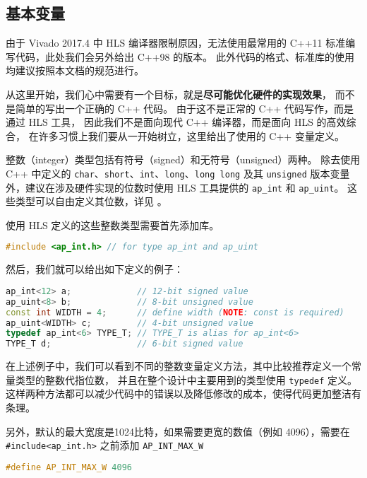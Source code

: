 \documentclass[Chinese,TC,use boldface,simple Names]{beaulivre}
\begin{document}
    \subsection{基本变量}

      \begin{warning}
        由于 Vivado 2017.4 中 HLS 编译器限制原因，无法使用最常用的 C++11 标准编写代码，此处我们会另外给出 C++98 的版本。
        此外代码的格式、标准库的使用均建议按照本文档的规范进行。
      \end{warning}

      从这里开始，我们心中需要有一个目标，就是\textbf{尽可能优化硬件的实现效果}，
      而不是简单的写出一个正确的 C++ 代码。
      由于这不是正常的 C++ 代码写作，而是通过 HLS 工具，
      因此我们不是面向现代 C++ 编译器，而是面向 HLS 的高效综合，
      在许多习惯上我们要从一开始树立，这里给出了使用的 C++ 变量定义。

      \begin{definition}[整数类型]
        整数（integer）类型包括有符号（signed）和无符号（unsigned）两种。
        除去使用 C++ 中定义的 \texttt{char}、\texttt{short}、\texttt{int}、\texttt{long}、\texttt{long long} 及其 \texttt{unsigned} 版本变量外，建议在涉及硬件实现的位数时使用 HLS 工具提供的 \texttt{ap\_int} 和 \texttt{ap\_uint}。
        这些类型可以自由定义其位数，详见    。
      \end{definition}
      \begin{example}[整数类型]
        使用 HLS 定义的这些整数类型需要首先添加库。
        \begin{lstlisting}[language=C++,numbers=none]
#include <ap_int.h> // for type ap_int and ap_uint
        \end{lstlisting}
        然后，我们就可以给出如下定义的例子：
        \begin{lstlisting}[language=C++,numbers=none,morekeywords={ap\_int,ap\_uint}]
ap_int<12> a;             // 12-bit signed value 
ap_uint<8> b;             // 8-bit unsigned value
const int WIDTH = 4;      // define width (NOTE: const is required)
ap_uint<WIDTH> c;         // 4-bit unsigned value
typedef ap_int<6> TYPE_T; // TYPE_T is alias for ap_int<6>
TYPE_T d;                 // 6-bit signed value
        \end{lstlisting}
        在上述例子中，我们可以看到不同的整数变量定义方法，其中比较推荐定义一个常量类型的整数代指位数，
        并且在整个设计中主要用到的类型使用 \texttt{typedef} 定义。
        这样两种方法都可以减少代码中的错误以及降低修改的成本，使得代码更加整洁有条理。

        另外，默认的最大宽度是1024比特，如果需要更宽的数值（例如 4096），需要在 \verb|#include<ap_int.h>| 之前添加 \texttt{AP\_INT\_MAX\_W}
        \begin{lstlisting}[language=C++,numbers=none]
#define AP_INT_MAX_W 4096
        \end{lstlisting}
      \end{example}
\end{document}
